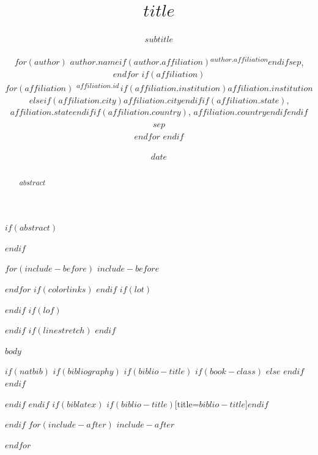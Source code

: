 \documentclass[
$if(fontsize)$
  $fontsize$,
$endif$
$if(papersize)$
  $papersize$paper,
$endif$
$for(classoption)$
  $classoption$$sep$,
$endfor$
]{$documentclass$}
\title{$title$}
\title{}
\subtitle{$subtitle$}
\author{%
  $for(author)$
    $author.name$$if(author.affiliation)$\textsuperscript{$author.affiliation$}$endif$$sep$,
  $endfor$
  $if(affiliation)$
    \\[0.4em]\normalsize
    $for(affiliation)$
      \textsuperscript{$affiliation.id$}\,$if(affiliation.institution)$$affiliation.institution$$else$$if(affiliation.city)$$affiliation.city$$endif$$if(affiliation.state)$, $affiliation.state$$endif$$if(affiliation.country)$, $affiliation.country$$endif$$endif$$sep$\\
    $endfor$
  $endif$
}
\author{}
\date{$date$}
\date{}
\begin{document}

\maketitle
\thispagestyle{plain}

$if(abstract)$
\begin{abstract}
\noindent $abstract$
\end{abstract}
$endif$

$for(include-before)$
$include-before$

$endfor$
\clearpage
{
$if(colorlinks)$
  \hypersetup{linkcolor=$if(toccolor)$$toccolor$$else$black$endif$}
$endif$
  \setcounter{tocdepth}{$if(toc-depth)$$toc-depth$$else$1$endif$}
  \tableofcontents
}
\clearpage
$if(lot)$
\listoftables
$endif$
$if(lof)$
\listoffigures
$endif$
$if(linestretch)$
$endif$

$body$

$if(natbib)$
$if(bibliography)$
$if(biblio-title)$
$if(book-class)$
\renewcommand\bibname{$biblio-title$}
$else$
\renewcommand\refname{$biblio-title$}
$endif$
$endif$


$endif$
$endif$
$if(biblatex)$
\printbibliography$if(biblio-title)$[title=$biblio-title$]$endif$

$endif$
$for(include-after)$
$include-after$

$endfor$
\end{document}
